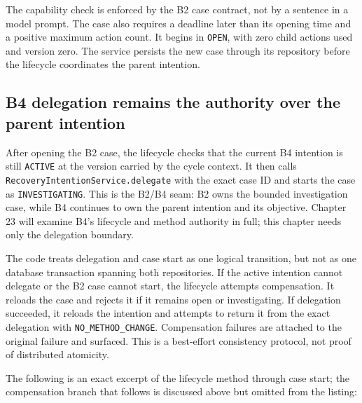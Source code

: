 The capability check is enforced by the B2 case contract, not by a sentence in a model prompt. The case also requires a deadline later than its opening time and a positive maximum action count. It begins in \texttt{OPEN}, with zero child actions used and version zero. The service persists the new case through its repository before the lifecycle coordinates the parent intention.

\subsection{B4 delegation remains the authority over the parent intention}
\label{subsec:ch22-b4-delegation}

After opening the B2 case, the lifecycle checks that the current B4 intention is still \texttt{ACTIVE} at the version carried by the cycle context. It then calls \texttt{Recovery\allowbreak Intention\allowbreak Service.\allowbreak delegate} with the exact case ID and starts the case as \texttt{INVESTIGATING}. This is the B2/B4 seam: B2 owns the bounded investigation case, while B4 continues to own the parent intention and its objective. Chapter 23 will examine B4's lifecycle and method authority in full; this chapter needs only the delegation boundary.

The code treats delegation and case start as one logical transition, but not as one database transaction spanning both repositories. If the active intention cannot delegate or the B2 case cannot start, the lifecycle attempts compensation. It reloads the case and rejects it if it remains open or investigating. If delegation succeeded, it reloads the intention and attempts to return it from the exact delegation with \texttt{NO\_\allowbreak METHOD\_\allowbreak CHANGE}. Compensation failures are attached to the original failure and surfaced. This is a best-effort consistency protocol, not proof of distributed atomicity.

The following is an exact excerpt of the lifecycle method through case start; the compensation branch that follows is discussed above but omitted from the listing:


